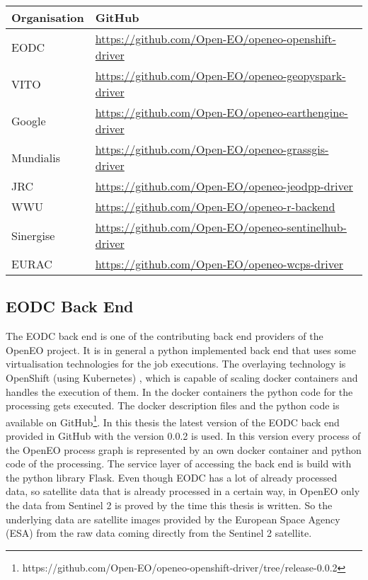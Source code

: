 \documentclass[draft,final]{vutinfth} %
\begin{document}
\begin{table}[]
	\begin{tabular}{l|l}
		\textbf{Organisation} & \textbf{GitHub}  \\ \hline
		EODC & \url{https://github.com/Open-EO/openeo-openshift-driver} \\ \hline 
		VITO & \url{https://github.com/Open-EO/openeo-geopyspark-driver} \\ \hline  
		Google  & \url{https://github.com/Open-EO/openeo-earthengine-driver} \\ \hline  
		Mundialis & \url{https://github.com/Open-EO/openeo-grassgis-driver} \\ \hline 
		JRC & \url{https://github.com/Open-EO/openeo-jeodpp-driver} \\ \hline
		WWU & \url{https://github.com/Open-EO/openeo-r-backend} \\ \hline
		Sinergise & \url{https://github.com/Open-EO/openeo-sentinelhub-driver} \\ \hline
		EURAC & \url{https://github.com/Open-EO/openeo-wcps-driver} \\ 
	\end{tabular}
\end{table}

\subsection{EODC Back End}\label{EODC Back End}
 
 The EODC back end is one of the contributing back end providers of the OpenEO project. It is in general a python implemented back end that uses some virtualisation technologies for the job executions. The overlaying technology is OpenShift (using Kubernetes) \cite{openshift}, which is capable of scaling docker containers and handles the execution of them. In the docker containers the python code for the processing gets executed. The docker description files and the python code is available on GitHub\footnote{https://github.com/Open-EO/openeo-openshift-driver/tree/release-0.0.2}. In this thesis the latest version of the EODC back end provided in GitHub with the version 0.0.2 is used. In this version every process of the OpenEO process graph is represented by an own docker container and python code of the processing. The service layer of accessing the back end is build with the python library Flask. Even though EODC has a lot of already processed data, so satellite data that is already processed in a certain way, in OpenEO only the data from Sentinel 2 is proved by the time this thesis is written. So the underlying data are satellite images provided by the European Space Agency (ESA) from the raw data coming directly from the Sentinel 2 satellite. 
\end{document}

